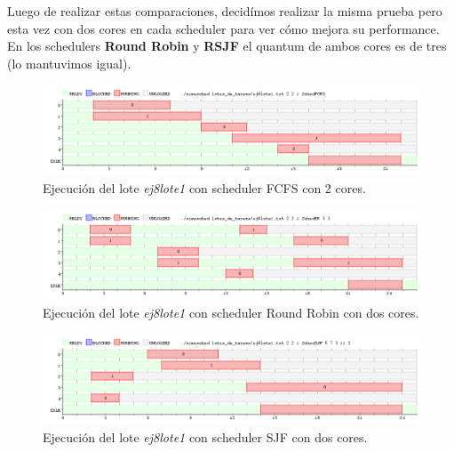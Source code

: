 Luego de realizar estas comparaciones, decidímos realizar la misma prueba pero esta vez con dos cores en cada scheduler para ver cómo mejora su performance. En los schedulers \textbf{Round Robin} y \textbf{RSJF} el quantum de ambos cores es de tres (lo mantuvimos igual).

\begin{figure}[!h]
	\begin{center}
		\includegraphics[width=500px]{imagenes/ej8_prueba1_fcfs2.png}
		\caption{Ejecución del lote \emph{ej8lote1} con scheduler FCFS con 2 cores.}
		\label{fig:grafico_ej8_prueba1_fcfs2}
	\end{center}
\end{figure}

\newpage

\begin{figure}[!h]
	\begin{center}
		\includegraphics[width=500px]{imagenes/ej8_prueba1_rr2.png}
		\caption{Ejecución del lote \emph{ej8lote1} con scheduler Round Robin con dos cores.}
		\label{fig:grafico_ej8_prueba1_rr2}
	\end{center}
\end{figure}

\begin{figure}[!h]
	\begin{center}
		\includegraphics[width=500px]{imagenes/ej8_prueba1_sjf2.png}
		\caption{Ejecución del lote \emph{ej8lote1} con scheduler SJF con dos cores.}
		\label{fig:grafico_ej8_prueba1_sjf2}
	\end{center}
\end{figure}

